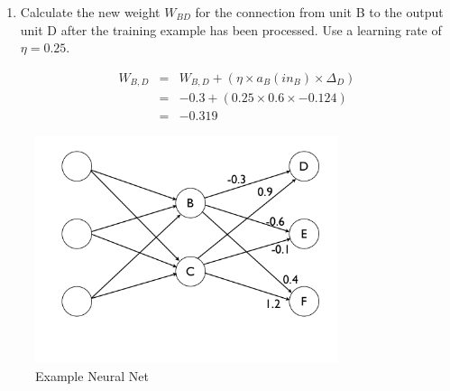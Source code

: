 \documentclass[--SOLUTION-OPTION--]{ditpaper}
\begin{document}
\begin{enumerate}
\begin{enumerate}
%
%
	\item Calculate the new weight $W_{BD}$ for the connection from unit B to the output unit D after the training example has been processed. Use a learning rate of $\eta = 0.25$.
		\begin{answer}
		\begin{eqnarray*}			
		W_{B,D} &=& W_{B,D} + (\eta \times a_B(in_B) \times \Delta_D)\\
				&=& -0.3 + (0.25 \times 0.6 \times -0.124)\\
		           &=& -0.319
		\end{eqnarray*}
	\end{answer}
\end{enumerate}

\end{enumerate}

\clearpage
\newpage

\begin{figure}[htbp]
\begin{center}
\includegraphics[width=3.5in]{./images/backpropnetwork1.png}
\caption{Example Neural Net}
\label{fig:nn}
\end{center}
\end{figure}
\end{document}
